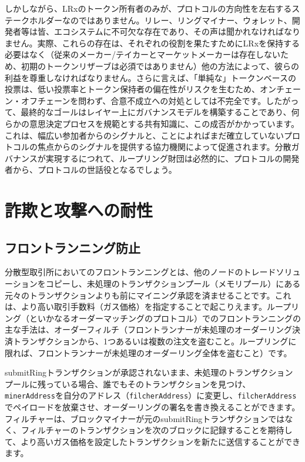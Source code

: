 \documentclass{article}
\begin{document}
\begin{multicols}{2}
しかしながら、LRxのトークン所有者のみが、プロトコルの方向性を左右するステークホルダーなのではありません。リレー、リングマイナー、ウォレット、開発者等は皆、エコシステムに不可欠な存在であり、その声は聞かれなければなりません。実際、これらの存在は、それぞれの役割を果たすためにLRxを保持する必要はなく（従来のメーカー/テイカーとマーケットメーカーは存在しないため、初期のトークンリザーブは必須ではありません）他の方法によって、彼らの利益を尊重しなければなりません。さらに言えば、「単純な」トークンベースの投票は、低い投票率とトークン保持者の偏在性がリスクを生むため、オンチェーン・オフチェーンを問わず、合意不成立への対処としては不完全です。したがって、最終的なゴールはレイヤー上にガバナンスモデルを構築することであり、何らかの意思決定プロセスを規範とする共有知識に、この成否がかかっています。これは、幅広い参加者からのシグナルと、ことによればまだ確立していないプロトコルの焦点からのシグナルを提供する協力機関によって促進されます。分散ガバナンスが実現するにつれて、ループリング財団は必然的に、プロトコルの開発者から、プロトコルの世話役となるでしょう。

\section{詐欺と攻撃への耐性}

\subsection{フロントランニング防止\label{sec:dual_authoring}}

分散型取引所においてのフロントランニングとは、他のノードのトレードソリューションをコピーし、未処理のトランザクションプール（メモリプール）にある元々のトランザクションよりも前にマイニング承認を済ませることです。これは、より高い取引手数料（ガス価格）を指定することで起こりえます。ループリング（といかなるオーダーマッチングのプロトコル）でのフロントランニングの主な手法は、オーダーフィルチ（フロントランナーが未処理のオーダーリング決済トランザクションから、1つあるいは複数の注文を盗むこと。ループリングに限れば、フロントランナーが未処理のオーダーリング全体を盗むこと）です。

submitRingトランザクションが承認されないまま、未処理のトランザクションプールに残っている場合、誰でもそのトランザクションを見つけ、\verb|minerAddress|を自分のアドレス（\verb|filcherAddress|）に変更し、\verb|filcherAddress|でペイロードを放棄させ、オーダーリングの署名を書き換えることができます。フィルチャーは、ブロックマイナーが元のsubmitRingトランザクションではなく、フィルチャーのトランザクションを次のブロックに記録することを期待して、より高いガス価格を設定したトランザクションを新たに送信することができます。


\end{multicols}
\end{document}
